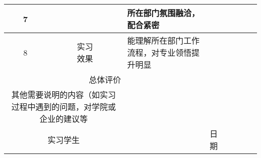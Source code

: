 \begin{table}[H]
\begin{tabular}{ |c|c|p{40mm}|p{12mm}|p{10mm}|p{10mm}|p{10mm}|p{10mm}| }
\cline{1-1} \cline{3-8}

7   &                                             & 所在部门氛围融洽，配合紧密 &  &  &  &  & \\


\hline

8   &  \tabincell{c}{实习\\效果}  & 能理解所在部门工作流程，对专业领悟提升明显 &  &  &  &  & \\

\hline

\multicolumn{3}{|c|}{总体评价}  &  &  &  &  & \\

\hline

\multicolumn{2}{|p{2cm}|}{其他需要说明的内容（如实习过程中遇到的问题，对学院或企业的建议等 }  & \multicolumn{6}{|c|}{} \\

\hline

\multicolumn{2}{|c|}{实习学生} &  & 日期 &  \multicolumn{4}{|c|}{}  \\

\hline

\end{tabular}
\end{table}
